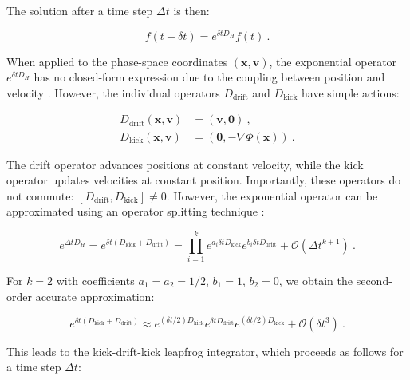 The solution after a time step $\Delta t$ is then:

\begin{equation}
	f(t+\delta t) = e^{\delta t D_H}f(t)~. \label{eq:3.51}
\end{equation}

When applied to the phase-space coordinates $(\mathbf{x}, \mathbf{v})$, the exponential operator $e^{\delta t D_H}$ has no closed-form expression due to the coupling between position and velocity \citep{zwart2018astrophysical}. However, the individual operators $D_{\mathrm{drift}}$ and $D_{\mathrm{kick}}$ have simple actions:

\begin{align} 
	D_{\mathrm{drift}}(\mathbf{x}, \mathbf{v}) &= (\mathbf{v}, \mathbf{0})~, \\ 
	D_{\mathrm{kick}}(\mathbf{x}, \mathbf{v}) &= (\mathbf{0}, -\nabla \Phi(\mathbf{x}))~. 
\end{align}

The drift operator advances positions at constant velocity, while the kick operator updates velocities at constant position. Importantly, these operators do not commute: $[D_{\mathrm{drift}}, D_{\mathrm{kick}}] \neq 0$. However, the exponential operator can be approximated using an operator splitting technique \citep{fujii2007bridge}:

\begin{equation} 
	e^{\Delta t D_H} = e^{\delta t (D_{\mathrm{kick}} + D_{\mathrm{drift}})} = \prod_{i=1}^{k} e^{a_i \delta t D_{\mathrm{kick}}} e^{b_i \delta t D_{\mathrm{drift}}} + \mathcal{O}(\Delta t^{k+1})~.
\end{equation}

For $k=2$ with coefficients $a_1 = a_2 = 1/2$, $b_1 = 1$, $b_2 = 0$, we obtain the second-order accurate approximation:

\begin{equation} 
	e^{\delta t (D_{\mathrm{kick}} + D_{\mathrm{drift}})} \approx e^{(\delta t/2) D_{\mathrm{kick}}} e^{\delta t D_{\mathrm{drift}}} e^{(\delta t/2) D_{\mathrm{kick}}} + \mathcal{O}(\delta t^3)~.
\end{equation}


This leads to the kick-drift-kick leapfrog integrator, which proceeds as follows for a time step $\Delta t$:

